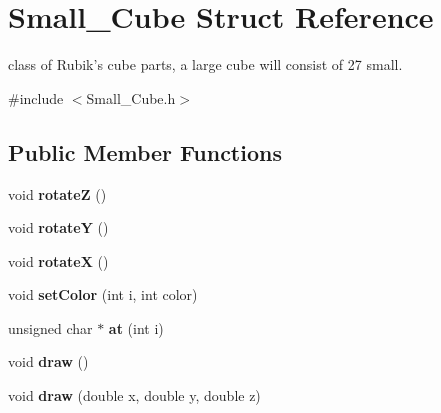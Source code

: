 \hypertarget{struct_small___cube}{\section{Small\-\_\-\-Cube Struct Reference}
\label{struct_small___cube}
}


class of Rubik's cube parts, a large cube will consist of 27 small.  




{\ttfamily \#include $<$Small\-\_\-\-Cube.\-h$>$}

\subsection*{Public Member Functions}
\begin{DoxyCompactItemize}
\item 
\hypertarget{struct_small___cube_a2894447f053f6f107c97940a49721a6e}{void {\bfseries rotate\-Z} ()}\label{struct_small___cube_a2894447f053f6f107c97940a49721a6e}

\item 
\hypertarget{struct_small___cube_a31f72510ae43c421b1a9c70b75bf02be}{void {\bfseries rotate\-Y} ()}\label{struct_small___cube_a31f72510ae43c421b1a9c70b75bf02be}

\item 
\hypertarget{struct_small___cube_acba0efda0d2c7142425db23f14d99d61}{void {\bfseries rotate\-X} ()}\label{struct_small___cube_acba0efda0d2c7142425db23f14d99d61}

\item 
\hypertarget{struct_small___cube_a1ffa6671b622420ab6656cede51adf70}{void {\bfseries set\-Color} (int i, int color)}\label{struct_small___cube_a1ffa6671b622420ab6656cede51adf70}

\item 
\hypertarget{struct_small___cube_a556e89983928209a579d1f97ba86f941}{unsigned char $\ast$ {\bfseries at} (int i)}\label{struct_small___cube_a556e89983928209a579d1f97ba86f941}

\item 
\hypertarget{struct_small___cube_a201407489e69413002a5e8b7800e95b4}{void {\bfseries draw} ()}\label{struct_small___cube_a201407489e69413002a5e8b7800e95b4}

\item 
\hypertarget{struct_small___cube_a77adc7e9e3f6bbbcf85e5f3506650fb9}{void {\bfseries draw} (double x, double y, double z)}\label{struct_small___cube_a77adc7e9e3f6bbbcf85e5f3506650fb9}

\end{DoxyCompactItemize}
